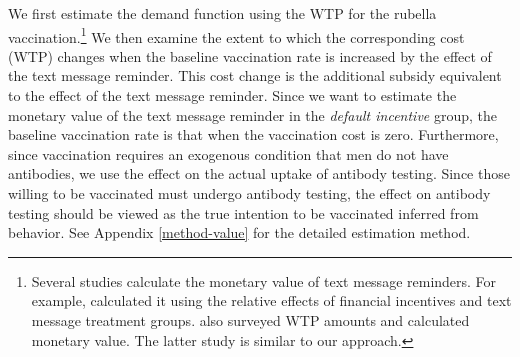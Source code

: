 \documentclass[
]{article}
\begin{document}
We first estimate the demand function using the WTP for the rubella vaccination.\footnote{Several studies calculate the monetary value of text message reminders. For example, \citet{Bursztyn2019} calculated it using the relative effects of financial incentives and text message treatment groups. \citet{Moriwaki2020} also surveyed WTP amounts and calculated monetary value. The latter study is similar to our approach.} We then examine the extent to which the corresponding cost (WTP) changes when the baseline vaccination rate is increased by the effect of the text message reminder. This cost change is the additional subsidy equivalent to the effect of the text message reminder. Since we want to estimate the monetary value of the text message reminder in the \emph{default incentive} group, the baseline vaccination rate is that when the vaccination cost is zero. Furthermore, since vaccination requires an exogenous condition that men do not have antibodies, we use the effect on the actual uptake of antibody testing. Since those willing to be vaccinated must undergo antibody testing, the effect on antibody testing should be viewed as the true intention to be vaccinated inferred from behavior. See Appendix \ref{method-value} for the detailed estimation method.
\end{document}

